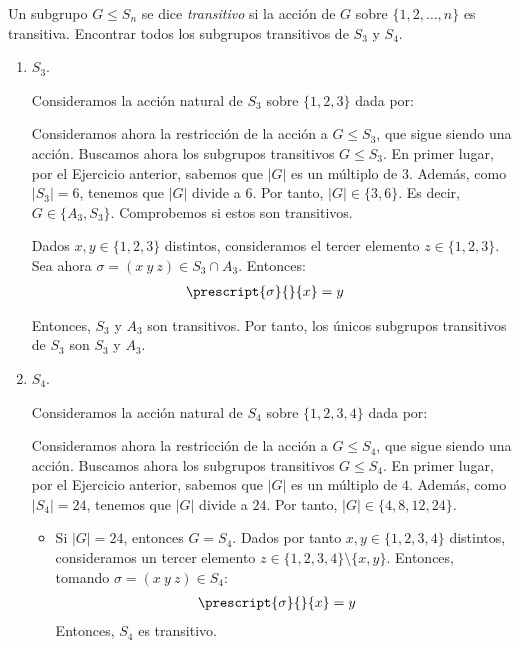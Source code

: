 \begin{ejercicio}\label{ej:6.8}
    Un subgrupo $G \leq S_n$ se dice \emph{transitivo} si la acción de $G$ sobre $\{1, 2, \ldots, n\}$ es transitiva. Encontrar todos los subgrupos transitivos de $S_3$ y $S_4$.
    \begin{enumerate}
        \item $S_3$.
        
        Consideramos la acción natural de $S_3$ sobre $\{1, 2, 3\}$ dada por:

        Consideramos ahora la restricción de la acción a $G\leq S_3$, que sigue siendo una acción.
        Buscamos ahora los subgrupos transitivos $G\leq S_3$. En primer lugar, por el Ejercicio anterior, sabemos que $|G|$ es un múltiplo de $3$. Además, como $|S_3| = 6$, tenemos que $|G|$ divide a $6$. Por tanto, $|G|\in \{3,6\}$. Es decir, $G\in \{A_3, S_3\}$. Comprobemos si estos son transitivos.

        Dados $x,y\in \{1, 2, 3\}$ distintos, consideramos el tercer elemento $z\in \{1, 2, 3\}$. Sea ahora $\sigma=(x\ y\ z)\in S_3\cap A_3$. Entonces:
        \begin{align*}
            \prescript{\sigma}{}{x} &= y
        \end{align*}

        Entonces, $S_3$ y $A_3$ son transitivos. Por tanto, los únicos subgrupos transitivos de $S_3$ son $S_3$ y $A_3$.

        \item $S_4$.
        
        Consideramos la acción natural de $S_4$ sobre $\{1, 2, 3, 4\}$ dada por:

        Consideramos ahora la restricción de la acción a $G\leq S_4$, que sigue siendo una acción.
        Buscamos ahora los subgrupos transitivos $G\leq S_4$. En primer lugar, por el Ejercicio anterior, sabemos que $|G|$ es un múltiplo de $4$. Además, como $|S_4| = 24$, tenemos que $|G|$ divide a $24$. Por tanto, $|G|\in \{4,8,12,24\}$.
        \begin{itemize}
            \item Si $|G|=24$, entonces $G=S_4$. Dados por tanto $x,y\in \{1, 2, 3, 4\}$ distintos, consideramos un tercer elemento $z\in \{1, 2, 3, 4\}\setminus \{x,y\}$. Entonces, tomando $\sigma=(x\ y\ z)\in S_4$:
            \begin{align*}
                \prescript{\sigma}{}{x} &= y
            \end{align*}
            Entonces, $S_4$ es transitivo.


\end{itemize}
\end{enumerate}
\end{ejercicio}
